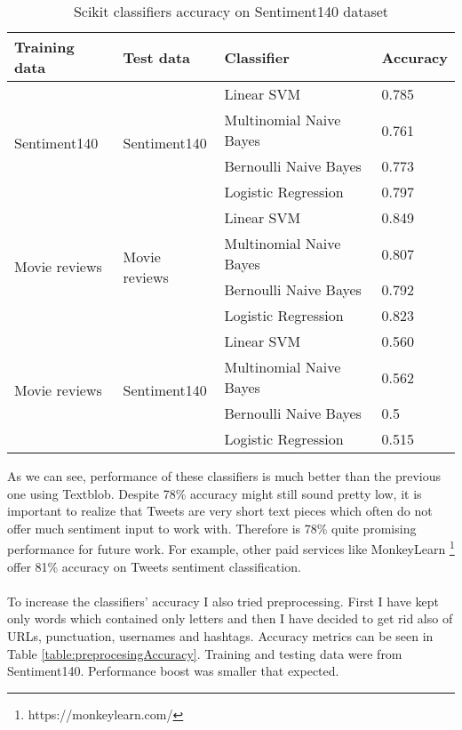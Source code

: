 \begin{table}[H]
\centering
\begin{tabular}{| p{2.5cm}|p{2.5cm}|p{4.5cm}|p{2cm}|}
 \hline
\textbf{ Training data }& \textbf{Test data} & \textbf{ Classifier }& \textbf{Accuracy}\\
 \hline
  \multirow{4}{*}{Sentiment140}   & \multirow{4}{*}{Sentiment140} & Linear SVM   & 0.785\\ 
    &  &  Multinomial Naive Bayes & 0.761\\ 
    &  &  Bernoulli Naive Bayes & 0.773\\  
    &  & Logistic Regression & 0.797\\ \hline 
  \multirow{4}{*}{Movie reviews}   & \multirow{4}{*}{Movie reviews} & Linear SVM   & 0.849\\ 
    &  &  Multinomial Naive Bayes & 0.807\\ 
    &  &  Bernoulli Naive Bayes & 0.792\\  
    &  & Logistic Regression & 0.823\\ \hline 
  \multirow{4}{*}{Movie reviews}   & \multirow{4}{*}{Sentiment140} & Linear SVM   & 0.560\\ 
    &  &  Multinomial Naive Bayes & 0.562\\ 
    &  &  Bernoulli Naive Bayes & 0.5\\  
    &  & Logistic Regression & 0.515\\ \hline 
\end{tabular}
\caption{Scikit classifiers accuracy on Sentiment140 dataset}
\label{table:scikitOnSentiment140}
\end{table}

As we can see, performance of these classifiers is much better than the previous one using Textblob. Despite 78\% accuracy might still sound pretty low, it is important to realize that Tweets are very short text pieces which often do not offer much sentiment input to work with. Therefore is 78\% quite promising performance for future work. For example, other paid services like MonkeyLearn \footnote{https://monkeylearn.com/} offer 81\% accuracy on Tweets sentiment classification.\\
\\
To increase the classifiers' accuracy I also tried preprocessing. First I have kept only words which contained only letters and then I have decided to get rid also of URLs, punctuation, usernames and hashtags. Accuracy metrics can be seen in Table \ref{table:preprocesingAccuracy}. Training and testing data were from Sentiment140. Performance boost was smaller that expected.

